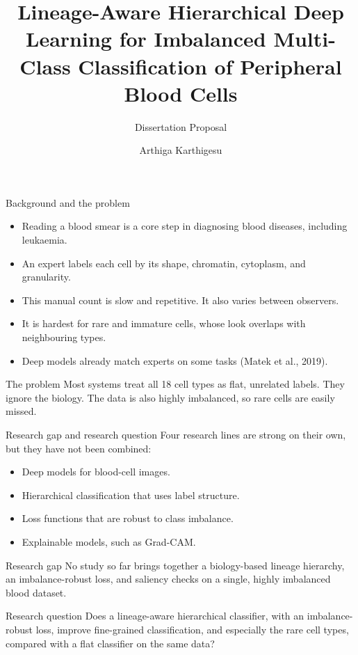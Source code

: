 \documentclass[aspectratio=169,11pt]{beamer}
\title[Hierarchical Blood-Cell Classification]{Lineage-Aware Hierarchical Deep Learning for
Imbalanced Multi-Class Classification of Peripheral Blood Cells}
\subtitle{Dissertation Proposal}
\author{Arthiga Karthigesu}
\date{}
\begin{document}
\begin{frame}[plain]
  \titlepage
\end{frame}

\begin{frame}{Background and the problem}
  \begin{itemize}
    \item Reading a blood smear is a core step in diagnosing blood diseases,
          including leukaemia.
    \item An expert labels each cell by its shape, chromatin, cytoplasm, and
          granularity.
    \item This manual count is slow and repetitive. It also varies between
          observers.
    \item It is hardest for rare and immature cells, whose look overlaps with
          neighbouring types.
    \item Deep models already match experts on some tasks (Matek et al., 2019).
  \end{itemize}

  \vspace{0.4em}
  \begin{alertblock}{The problem}
    Most systems treat all 18 cell types as flat, unrelated labels. They ignore
    the biology. The data is also highly imbalanced, so rare cells are easily
    missed.
  \end{alertblock}
\end{frame}

\begin{frame}{Research gap and research question}
  Four research lines are strong on their own, but they have not been combined:
  \begin{itemize}
    \item Deep models for blood-cell images.
    \item Hierarchical classification that uses label structure.
    \item Loss functions that are robust to class imbalance.
    \item Explainable models, such as Grad-CAM.
  \end{itemize}

  \begin{block}{Research gap}
    No study so far brings together a biology-based lineage hierarchy, an
    imbalance-robust loss, and saliency checks on a single, highly imbalanced
    blood dataset.
  \end{block}

  \begin{exampleblock}{Research question}
    Does a lineage-aware hierarchical classifier, with an imbalance-robust loss,
    improve fine-grained classification, and especially the rare cell types,
    compared with a flat classifier on the same data?
  \end{exampleblock}
\end{frame}
\end{document}
